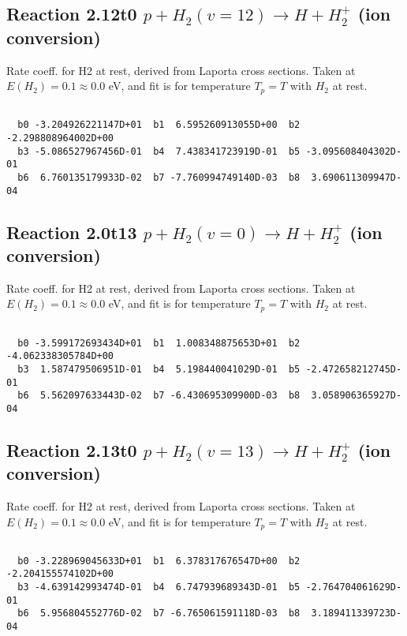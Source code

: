 \documentclass[12pt,dvipdfmx]{article}
\begin{document}
\newpage
\subsection{
Reaction 2.12t0
$ p + H_2(v=12) \rightarrow H + H_2^+$ (ion conversion)
}
Rate coeff. for H2 at rest, derived from Laporta cross sections.
Taken at $E(H_2) = 0.1 \approx 0.0$ eV,  and fit is for temperature $T_p=T$ with $H_2$ at rest.

\begin{small}\begin{verbatim}

  b0 -3.204926221147D+01  b1  6.595260913055D+00  b2 -2.298808964002D+00
  b3 -5.086527967456D-01  b4  7.438341723919D-01  b5 -3.095608404302D-01
  b6  6.760135179933D-02  b7 -7.760994749140D-03  b8  3.690611309947D-04

\end{verbatim}\end{small}

\newpage
\subsection{
Reaction 2.0t13
$ p + H_2(v=0) \rightarrow H + H_2^+$ (ion conversion)
}
Rate coeff. for H2 at rest, derived from Laporta cross sections.
Taken at $E(H_2) = 0.1 \approx 0.0$ eV,  and fit is for temperature $T_p=T$ with $H_2$ at rest.

\begin{small}\begin{verbatim}

  b0 -3.599172693434D+01  b1  1.008348875653D+01  b2 -4.062338305784D+00
  b3  1.587479506951D-01  b4  5.198440041029D-01  b5 -2.472658212745D-01
  b6  5.562097633443D-02  b7 -6.430695309900D-03  b8  3.058906365927D-04

\end{verbatim}\end{small}

\newpage
\subsection{
Reaction 2.13t0
$ p + H_2(v=13) \rightarrow H + H_2^+$ (ion conversion)
}
Rate coeff. for H2 at rest, derived from Laporta cross sections.
Taken at $E(H_2) = 0.1 \approx 0.0$ eV,  and fit is for temperature $T_p=T$ with $H_2$ at rest.

\begin{small}\begin{verbatim}

  b0 -3.228969045633D+01  b1  6.378317676547D+00  b2 -2.204155574102D+00
  b3 -4.639142993474D-01  b4  6.747939689343D-01  b5 -2.764704061629D-01
  b6  5.956804552776D-02  b7 -6.765061591118D-03  b8  3.189411339723D-04

\end{verbatim}\end{small}
\end{document}
